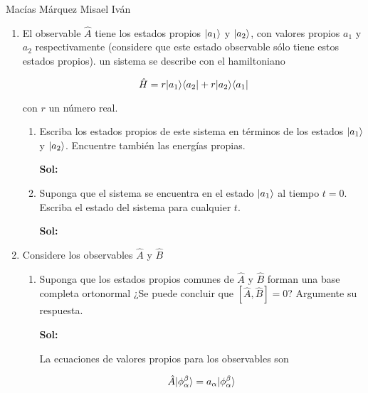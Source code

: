 \documentclass[12pt,a4paper]{article}
\DeclarePairedDelimiter\bra{\langle}{\rvert}
\DeclarePairedDelimiter\ket{\lvert}{\rangle}
\begin{document}
Macías Márquez Misael Iván

\begin{enumerate}






\item El observable $\hat{A}$ tiene los estados propios $\ket{a_1}$ y $\ket{a_2}$, con valores propios $a_1$ y $a_2$ respectivamente (considere que este estado observable sólo tiene estos estados propios). un sistema se describe con el hamiltoniano

\begin{equation*}
    \hat{H} = r \ket{a_1} \bra{a_2} + r \ket{a_2} \bra{a_1}
\end{equation*}

con $r$ un número real.

\begin{enumerate}
    \item Escriba los estados propios de este sistema en términos de los estados $\ket{a_1}$ y $\ket{a_2}$. Encuentre también las energías propias.
    
    \textbf{Sol:}
    
    \item Suponga que el sistema se encuentra en el estado $\ket{a_1}$ al tiempo $t = 0$. Escriba el estado del sistema para cualquier $t$.
    
    \textbf{Sol:}
\end{enumerate}






\item Considere los observables $\hat{A}$ y $\hat{B}$

\begin{enumerate}
    \item Suponga que los estados propios comunes de $\hat{A}$ y $\hat{B}$ forman una base completa ortonormal ¿Se puede concluir que $[\hat{A}, \hat{B}] =0$? Argumente su respuesta.
    
    \textbf{Sol:}
    
    La ecuaciones de valores propios para los observables son
    
    \begin{equation*}
        \hat{A} \ket{\phi_{\alpha}^{\beta}} = a_{\alpha} \ket{\phi_{\alpha}^{\beta}}
    \end{equation*}
    

\end{enumerate}
\end{enumerate}
\end{document}
